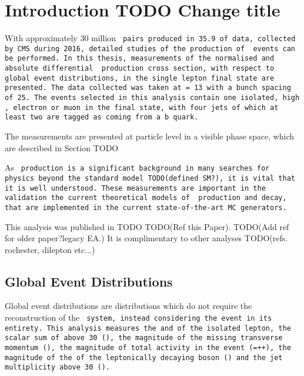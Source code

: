 \section{Introduction TODO Change title}
\label{sec:analysisIntro}

With approximately 30 million \tt{} pairs produced in 35.9\fbinv{} of data, collected by CMS during 2016, detailed studies of the production of \tt{} events can be performed. In this thesis, measurements of the normalised and absolute differential \tt{} production cross section, with respect to global event distributions, in the single lepton final state are presented. The data collected was taken at \com{} = 13\TeV{} with a bunch spacing of 25\ns{}. The events selected in this analysis contain one isolated, high \pt{}, electron or muon in the final state, with four jets of which at least two are tagged as coming from a b quark.

The measurements are presented at particle level in a visible phase space, which are described in Section TODO

As \tt{} production is a significant background in many searches for physics beyond the standard model TODO(defined SM?), it is vital that it is well understood. These measurements are important in the validation the current theoretical models of \tt{} production and decay, that are implemented in the current state-of-the-art MC generators. 

This analysis was published in TODO TODO(Ref this Paper). TODO(Add ref for older paper?legacy EA.) It is complimentary to other analyses TODO(refs. rochester, dilepton etc...)

\subsection{Global Event Distributions}
\label{ssec:gEventDist}

Global event distributions are distributions which do not require the reconstruction of the \tt{} system, instead considering the event in its entirety. This analysis measures the \LETA{} and \LPT{} of the isolated lepton, the scalar sum of \JPT{} above 30\GeV{} (\HT{}), the magnitude of the missing transverse momentum (\MET{}), the magnitude of total activity in the event (\ST{}=\HT{}+\MET{}+\LPT{}), the magnitude of the \pt{} of the leptonically decaying \Wboson{} boson (\WPT{}) and the jet multiplicity above 30\Gev{} (\NJET{}).


